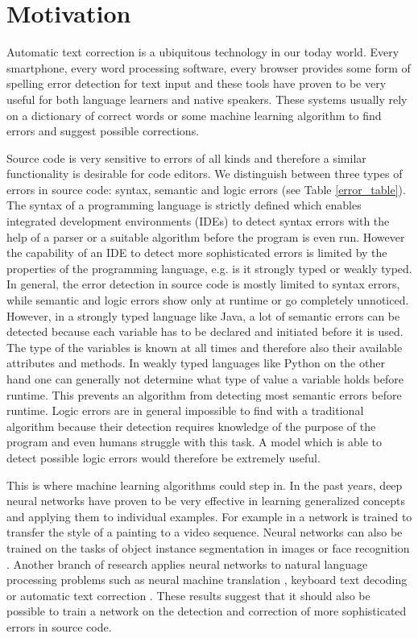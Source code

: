 \section{Motivation}
Automatic text correction is a ubiquitous technology in our today world. Every smartphone, every word processing software, every browser provides some form of spelling error detection for text input and these tools have proven to be very useful for both language learners and native speakers. These systems usually rely on a dictionary of correct words \cite{digram_correction, dictionary_correction} or some machine learning algorithm \cite{seq2seq_on_text_correction} to find errors and suggest possible corrections.

Source code is very sensitive to errors of all kinds and therefore a similar functionality is desirable for code editors. We distinguish between three types of errors in source code: syntax, semantic and logic errors (see Table \ref{error_table}). The syntax of a programming language is strictly defined which enables integrated development environments (IDEs) to detect syntax errors with the help of a parser or a suitable algorithm before the program is even run. However the capability of an IDE to detect more sophisticated errors is limited by the properties of the programming language, e.g. is it strongly typed or weakly typed. In general, the error detection in source code is mostly limited to syntax errors, while semantic and logic errors show only at runtime or go completely unnoticed. However, in a strongly typed language like Java, a lot of semantic errors can be detected because each variable has to be declared and initiated before it is used. The type of the variables is known at all times and therefore also their available attributes and methods. In weakly typed languages like Python on the other hand one can generally not determine what type of value a variable holds before runtime. This prevents an algorithm from detecting most semantic errors before runtime. Logic errors are in general impossible to find with a traditional algorithm because their detection requires knowledge of the purpose of the program and even humans struggle with this task. A model which is able to detect possible logic errors would therefore be extremely useful.

This is where machine learning algorithms could step in. In the past years, deep neural networks have proven to be very effective in learning generalized concepts and applying them to individual examples. For example in \cite{style_transfer} a network is trained to transfer the style of a painting to a video sequence. Neural networks can also be trained on the tasks of object instance segmentation in images \cite{segmentation} or face recognition \cite{face_recognition}. Another branch of research applies neural networks to natural language processing problems such as neural machine translation \cite{seq2seq}, keyboard text decoding \cite{seq2seq_keyboard} or automatic text correction \cite{seq2seq_on_text_correction}. These results suggest that it should also be possible to train a network on the detection and correction of more sophisticated errors in source code.

